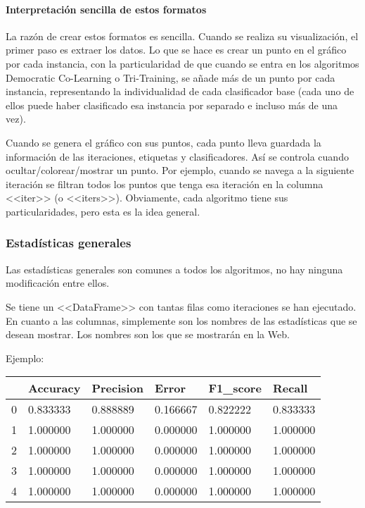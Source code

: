 \paragraph{Interpretación sencilla de estos formatos} La razón de crear estos
formatos es sencilla. Cuando se realiza su visualización, el primer paso es
extraer los datos. Lo que se hace es crear un punto en el gráfico por cada
instancia, con la particularidad de que cuando se entra en los algoritmos
Democratic Co-Learning o Tri-Training, se añade más de un punto por cada
instancia, representando la individualidad de cada clasificador base (cada uno
de ellos puede haber clasificado esa instancia por separado e incluso más de una
vez).

Cuando se genera el gráfico con sus puntos, cada punto lleva guardada la
información de las iteraciones, etiquetas y clasificadores. Así se controla
cuando ocultar/colorear/mostrar un punto. Por ejemplo, cuando se navega a la
siguiente iteración se filtran todos los puntos que tenga esa iteración en la
columna <<iter>> (o <<iters>>). Obviamente, cada algoritmo tiene sus
particularidades, pero esta es la idea general.

\subsubsection{Estadísticas generales}
Las estadísticas generales son comunes a todos los algoritmos, no hay ninguna
modificación entre ellos.

Se tiene un <<DataFrame>> con tantas filas como iteraciones se han ejecutado. En
cuanto a las columnas, simplemente son los nombres de las estadísticas que se
desean mostrar. Los nombres son los que se mostrarán en la Web.

Ejemplo:
\begin{table}[H]
\begin{tabular}{llllll}
  & Accuracy  & Precision & Error    & F1\_score & Recall    \\ \hline
0 & 0.833333  & 0.888889  & 0.166667 & 0.822222  & 0.833333  \\
1 & 1.000000 & 1.000000 & 0.000000 & 1.000000 & 1.000000 \\
2 & 1.000000 & 1.000000 & 0.000000 & 1.000000 & 1.000000 \\
3 & 1.000000 & 1.000000 & 0.000000 & 1.000000 & 1.000000 \\
4 & 1.000000 & 1.000000 & 0.000000 & 1.000000 & 1.000000
\end{tabular}
\end{table}

